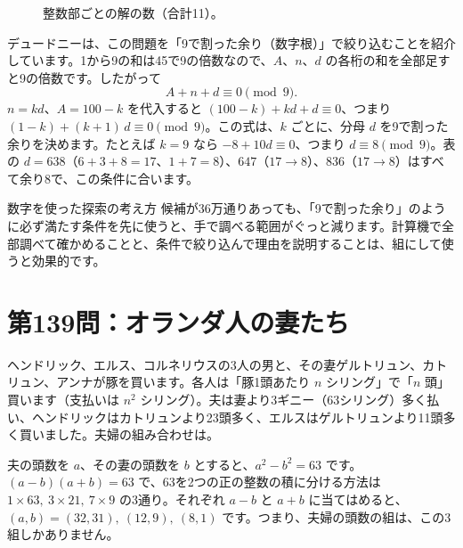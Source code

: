 \documentclass[a4paper,11pt,openany]{ltjsbook}
\begin{document}
\begin{figure}[htbp]
\centering
{}
\caption{整数部ごとの解の数（合計11）。}
\end{figure}

デュードニーは、この問題を「9で割った余り（数字根）」で絞り込むことを紹介しています。1から9の和は45で9の倍数なので、$A$、$n$、$d$ の各桁の和を全部足すと9の倍数です。したがって
\[
A+n+d\equiv0\pmod 9 .
\]
$n=kd$、$A=100-k$ を代入すると $(100-k)+kd+d\equiv0$、つまり $(1-k)+(k+1)\,d\equiv0\pmod 9$。この式は、$k$ ごとに、分母 $d$ を9で割った余りを決めます。たとえば $k=9$ なら $-8+10d\equiv0$、つまり $d\equiv8\pmod9$。表の $d=638$（$6+3+8=17$、$1+7=8$）、$647$（$17\to8$）、$836$（$17\to8$）はすべて余り8で、この条件に合います。

\begin{pointbox}{数字を使った探索の考え方}
候補が36万通りあっても、「9で割った余り」のように必ず満たす条件を先に使うと、手で調べる範囲がぐっと減ります。計算機で全部調べて確かめることと、条件で絞り込んで理由を説明することは、組にして使うと効果的です。
\end{pointbox}

\section{第139問：オランダ人の妻たち}

ヘンドリック、エルス、コルネリウスの3人の男と、その妻ゲルトリュン、カトリュン、アンナが豚を買います。各人は「豚1頭あたり $n$ シリング」で「$n$ 頭」買います（支払いは $n^2$ シリング）。夫は妻より3ギニー（63シリング）多く払い、ヘンドリックはカトリュンより23頭多く、エルスはゲルトリュンより11頭多く買いました。夫婦の組み合わせは。

夫の頭数を $a$、その妻の頭数を $b$ とすると、$a^2-b^2=63$ です。$(a-b)(a+b)=63$ で、63を2つの正の整数の積に分ける方法は $1\times63,\ 3\times21,\ 7\times9$ の3通り。それぞれ $a-b$ と $a+b$ に当てはめると、$(a,b)=(32,31),\ (12,9),\ (8,1)$ です。つまり、夫婦の頭数の組は、この3組しかありません。
\end{document}
